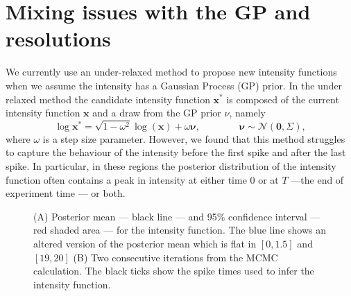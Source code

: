 \documentclass[oneside, 12 pt]{book}
\begin{document}
\section{Mixing issues with the GP and resolutions}
We currently use an under-relaxed method to propose new intensity functions when we assume the intensity has a Gaussian Process (GP) prior. In the under relaxed method the candidate intensity function $\mathbf{x}^*$ is composed of the current intensity function $\mathbf{x}$ and a draw from the GP prior $\nu$, namely  
\begin{equation}\label{eq:GPpropose}
\log \mathbf{x}^* = \sqrt{1-\omega^2} \log (\mathbf{x} ) + \omega \boldsymbol{\nu}, 
\qquad \qquad \boldsymbol{\nu} \sim \mathcal{N}(\mathbf{0}, \Sigma),
\end{equation}
where $\omega$ is a step size parameter.
However, we found that this method struggles to capture the behaviour of the intensity before the first spike and after the last spike. In particular, in these regions the posterior distribution of the intensity function often contains a peak in intensity at either time $0$ or at $T$ ---the end of experiment time --- or both.  
\begin{figure}[b!]
   \hrulefill
   \begin{center} 
    \end{center}     
    \caption{(A) Posterior mean --- black line --- and 95\% confidence interval --- red shaded area --- for the intensity function. The blue line shows an altered version of the posterior mean which is flat in $[0,1.5]$ and $[19,20]$  (B) Two consecutive iterations from the MCMC calculation. The black ticks show the spike times used to infer the intensity function.}
    \label{fig:ExampleProb}
    \end{figure}
\end{document}
